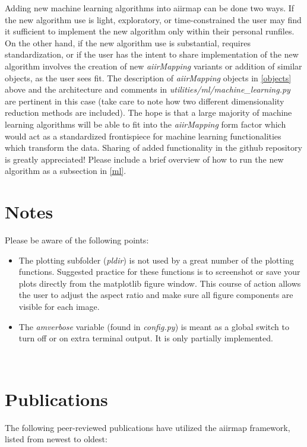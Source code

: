 \documentclass[a4paper,12pt,english]{article}
\begin{document}
    Adding new machine learning algorithms into aiirmap can be done two ways. If the new algorithm use is light, exploratory, or time-constrained the user may find it sufficient to implement the new algorithm only within their personal runfiles. On the other hand, if the new algorithm use is substantial, requires standardization, or if the user has the intent to share implementation of the new algorithm involves the creation of new \textit{aiirMapping} variants or addition of similar objects, as the user sees fit. The description of \textit{aiirMapping} objects in \autoref{objects} above and the architecture and comments in \textit{utilities/ml/machine\_learning.py} are pertinent in this case (take care to note how two different dimensionality reduction methods are included). The hope is that a large majority of machine learning algorithms will be able to fit into the \textit{aiirMapping} form factor which would act as a standardized frontispiece for machine learning functionalities which transform the data. Sharing of added functionality in the github repository is greatly appreciated! Please include a brief overview of how to run the new algorithm as a subsection in \autoref{ml}. \\

    
    

    \section{Notes} \label{notes}
    Please be aware of the following points:

    \begin{itemize}
        \item The plotting subfolder (\textit{pldir}) is not used by a great number of the plotting functions. Suggested practice for these functions is to screenshot or save your plots directly from the matplotlib figure window. This course of action allows the user to adjust the aspect ratio and make sure all figure components are visible for each image.
        \item The \textit{amverbose} variable (found in \textit{config.py}) is meant as a global switch to turn off or on extra terminal output. It is only partially implemented. 
    \end{itemize}\\
    
    \section{Publications} \label{pubs}
    The following peer-reviewed publications have utilized the aiirmap framework, listed from newest to oldest:
     
\end{document}
